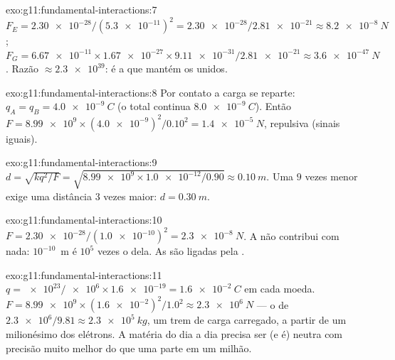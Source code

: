 \begin{solution}{exo:g11:fundamental-interactions:7}
$F_E = \num{2.30e-28}/(\num{5.3e-11})^2 = \num{2.30e-28}/\num{2.81e-21}
\approx \qty{8.2e-8}{N}$;
$F_G = \num{6.67e-11} \times \num{1.67e-27} \times \num{9.11e-31} /
\num{2.81e-21} \approx \qty{3.6e-47}{N}$. Razão $\approx \num{2.3e39}$: é
a  que mantém os  unidos.
\end{solution}

\begin{solution}{exo:g11:fundamental-interactions:8}
Por contato a carga se reparte: $q_A = q_B = \qty{+4.0e-9}{C}$ (o total
continua $\qty{8.0e-9}{C}$). Então
$F = \num{8.99e9} \times (\num{4.0e-9})^2/0.10^2 = \qty{1.4e-5}{N}$,
repulsiva (sinais iguais).
\end{solution}

\begin{solution}{exo:g11:fundamental-interactions:9}
$d = \sqrt{k q^2/F} = \sqrt{\num{8.99e9} \times \num{1.0e-12}/0.90}
\approx \qty{0.10}{m}$. Uma  $9$ vezes menor exige uma distância $3$
vezes maior: $d = \qty{0.30}{m}$.
\end{solution}

\begin{solution}{exo:g11:fundamental-interactions:10}
$F = \num{2.30e-28}/(\num{1.0e-10})^2 = \qty{2.3e-8}{N}$. A  não contribui com nada: $10^{-10}$~m é $10^{5}$ vezes o 
dela. As  são ligadas pela .
\end{solution}

\begin{solution}{exo:g11:fundamental-interactions:11}
$q = \num{e23}/\num{e6} \times \num{1.6e-19} = \qty{1.6e-2}{C}$ em cada
moeda. $F = \num{8.99e9} \times (\num{1.6e-2})^2/1.0^2 \approx
\qty{2.3e6}{N}$ --- o  de
$\num{2.3e6}/9.81 \approx \qty{2.3e5}{kg}$, um trem de carga carregado,
a partir de um milionésimo dos elétrons. A matéria do dia a dia precisa
ser (e é) neutra com precisão muito melhor do que uma parte em um
milhão.
\end{solution}

